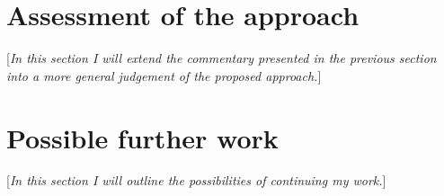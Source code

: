 \documentclass{pracamgr}
\begin{document}
\section{Assessment of the approach}
\label{sec:assessment}
[\textit{In this section I will extend the commentary presented in the previous section into a more general judgement of the proposed approach.}]

\section{Possible further work}
\label{sec:further_work}
[\textit{In this section I will outline the possibilities of continuing my work.}]

\printbibliography[heading=bibintoc]
\end{document}
